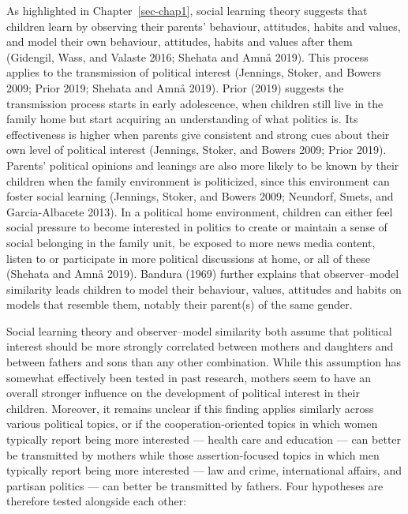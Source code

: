 \documentclass[
  letterpaper,
  DIV=11,
  numbers=noendperiod]{scrreprt}
\begin{document}
As highlighted in Chapter~\ref{sec-chap1}, social learning theory
suggests that children learn by observing their parents' behaviour,
attitudes, habits and values, and model their own behaviour, attitudes,
habits and values after them (Gidengil, Wass, and Valaste 2016; Shehata
and Amnå 2019). This process applies to the transmission of political
interest (Jennings, Stoker, and Bowers 2009; Prior 2019; Shehata and
Amnå 2019). Prior (2019) suggests the transmission process starts in
early adolescence, when children still live in the family home but start
acquiring an understanding of what politics is. Its effectiveness is
higher when parents give consistent and strong cues about their own
level of political interest (Jennings, Stoker, and Bowers 2009; Prior
2019). Parents' political opinions and leanings are also more likely to
be known by their children when the family environment is politicized,
since this environment can foster social learning (Jennings, Stoker, and
Bowers 2009; Neundorf, Smets, and Garcia-Albacete 2013). In a political
home environment, children can either feel social pressure to become
interested in politics to create or maintain a sense of social belonging
in the family unit, be exposed to more news media content, listen to or
participate in more political discussions at home, or all of these
(Shehata and Amnå 2019). Bandura (1969) further explains that
observer--model similarity leads children to model their behaviour,
values, attitudes and habits on models that resemble them, notably their
parent(s) of the same gender.

Social learning theory and observer--model similarity both assume that
political interest should be more strongly correlated between mothers
and daughters and between fathers and sons than any other combination.
While this assumption has somewhat effectively been tested in past
research, mothers seem to have an overall stronger influence on the
development of political interest in their children. Moreover, it
remains unclear if this finding applies similarly across various
political topics, or if the cooperation-oriented topics in which women
typically report being more interested --- health care and education ---
can better be transmitted by mothers while those assertion-focused
topics in which men typically report being more interested --- law and
crime, international affairs, and partisan politics --- can better be
transmitted by fathers. Four hypotheses are therefore tested alongside
each other:
\end{document}
